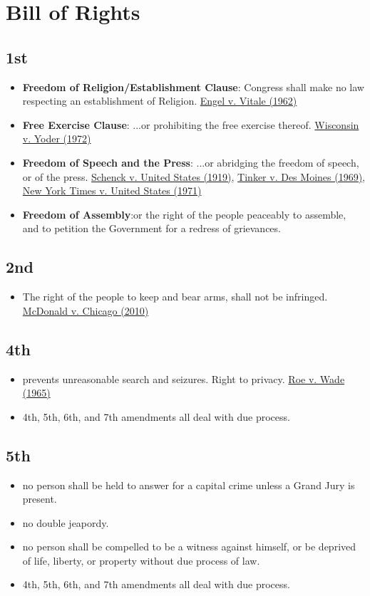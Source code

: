 \documentclass[12pt]{article}
\begin{document}
\section*{Bill of Rights}
\subsection*{1st}
	\begin{itemize}
		\item \textbf{Freedom of Religion/Establishment Clause}: Congress shall make no law respecting an establishment of Religion. \hyperlink{Engel}{Engel v. Vitale (1962)}
		\item \textbf{Free Exercise Clause}: ...or prohibiting the free exercise thereof. \hyperlink{Wisconsin}{Wisconsin v. Yoder (1972)}
		\item \textbf{Freedom of Speech and the Press}: ...or abridging the freedom of speech, or of the press. \hyperlink{Schenck}{Schenck v. United States (1919)}, \hyperlink{Tinker}{Tinker v. Des Moines (1969)}, \hyperlink{NYT Co.}{New York Times v. United States (1971)}
		\item \textbf{Freedom of Assembly}:or the right of the people peaceably to assemble, and to petition the Government for a redress of grievances.
	\end{itemize}

\subsection*{2nd}
	\begin{itemize}
		\item The right of the people to keep and bear arms, shall not be infringed. \hyperlink{McDonald}{McDonald v. Chicago (2010)}
	\end{itemize}
\subsection*{4th}
	\begin{itemize}
		\item prevents unreasonable search and seizures. Right to privacy. \hyperlink{Roe}{Roe v. Wade (1965)}
		\item 4th, 5th, 6th, and 7th amendments all deal with due process.
	\end{itemize}
\subsection*{5th}
	\begin{itemize}
		\item no person shall be held to answer for a capital crime unless a Grand Jury is present.
		\item no double jeapordy.
		\item no person shall be compelled to be a witness against himself, or be deprived of life, liberty, or property without due process of law.
		\item 4th, 5th, 6th, and 7th amendments all deal with due process.
	\end{itemize}
\end{document}
